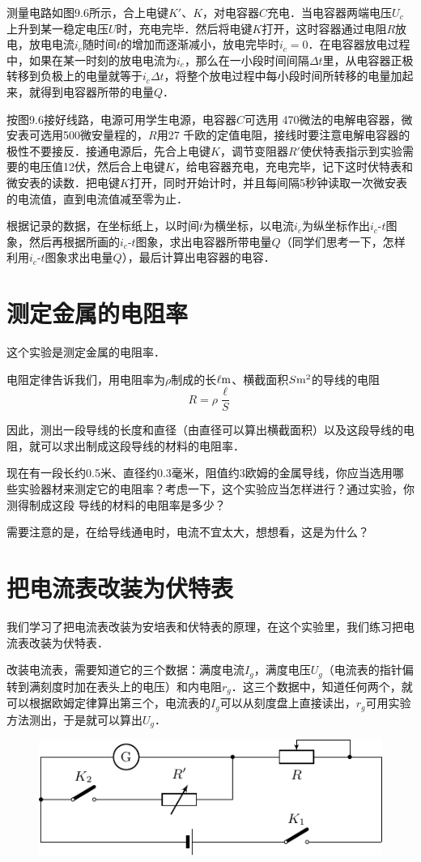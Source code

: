 测量电路如图9.6所示，合上电键$K'$、$K$，对电容器$C$充电．当电容器两端电压$U_c$上升到某一稳定电压$U$时，充电完毕．然后将电键$K$打开，这时容器通过电阻$R$放电，放电电流$i_c$随时间$t$的增加而逐渐减小，放电完毕时$i_c=0$．在电容器放电过程中，如果在某一时刻的放电电流为$i_c$，那么在一小段时间间隔$\Delta t$里，从电容器正极转移到负极上的电量就等于$i_c\Delta t$，将整个放电过程中每小段时间所转移的电量加起来，就得到电容器所带的电量$Q$．

按图9.6接好线路，电源可用学生电源，电容器$C$可选用
470微法的电解电容器，微安表可选用500微安量程的，$R$用27
千欧的定值电阻，接线时要注意电解电容器的极性不要接反．接通电源后，先合上电键$K$，调节变阻器$R'$使伏特表指示到实验需要的电压值12伏，然后合上电键$K$，给电容器充电，充电完毕，记下这时伏特表和微安表的读数．把电键$K$打开，同时开始计时，并且每间隔5秒钟读取一次微安表的电流值，直到电流值减至零为止．

根据记录的数据，在坐标纸上，以时间$t$为横坐标，以电流$i_c$为纵坐标作出$i_c$-$t$图象，然后再根据所画的$i_c$-$t$图象，求出电容器所带电量$Q$（同学们思考一下，怎样利用$i_c$-$t$图象求出电量$Q$），最后计算出电容器的电容．

\section{测定金属的电阻率}
这个实验是测定金属的电阻率．

电阻定律告诉我们，用电阻率为$\rho$制成的长$\ell{\rm m}$、横截面积$S{\rm m^2}$的导线的电阻
\[R=\rho\frac{\ell}{S}\]

因此，测出一段导线的长度和直径（由直径可以算出横截面积）以及这段导线的电阻，就可以求出制成这段导线的材料的电阻率．

现在有一段长约0.5米、直径约0.3毫米，阻值约3欧姆的金属导线，你应当选用哪些实验器材来测定它的电阻率？考虑一下，这个实验应当怎样进行？通过实验，你测得制成这段
导线的材料的电阻率是多少？

需要注意的是，在给导线通电时，电流不宜太大，想想看，这是为什么？

\section{把电流表改装为伏特表}
我们学习了把电流表改装为安培表和伏特表的原理，在这个实验里，我们练习把电流表改装为伏特表．

改装电流表，需要知道它的三个数据：满度电流$I_g$，满度电压$U_g$（电流表的指针偏转到满刻度时加在表头上的电压）和内电阻$r_g$．这三个数据中，知道任何两个，就可以根据欧姆定律算出第三个，电流表的$I_g$可以从刻度盘上直接读出，$r_g$可用实验方法测出，于是就可以算出$U_g$．
\begin{figure}[htbp]
    \centering
    \includegraphics{fig/B/9-7.pdf}
    \caption{}\label{fig_B_9-7}
\end{figure}

